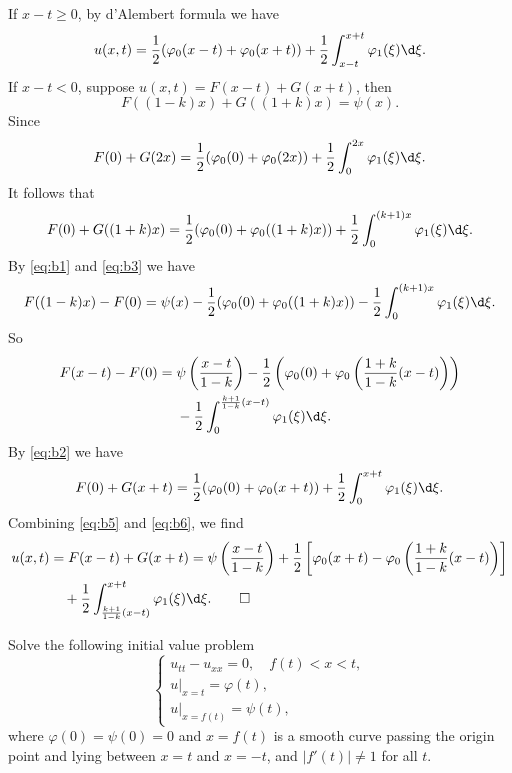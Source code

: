 \begin{solve}
  If $x-t\geq 0$, by d'Alembert formula we have
  \[u(x,t) = \frac{1}{2}(\varphi_0(x-t)+\varphi_0(x+t))
    + \frac{1}{2}\int_{x-t}^{x+t}\varphi_1(\xi)\d\xi.\]
  If $x-t<0$, suppose $u(x,t) = F(x-t) + G(x+t)$, then
  \begin{equation}\label{eq:b1}
    F((1-k)x)+G((1+k)x)=\psi(x).
  \end{equation}
  Since
  \begin{equation}\label{eq:b2}
    F(0)+G(2x)=\frac{1}{2}(\varphi_0(0)+\varphi_0(2x))+\frac{1}{2}\int_0^{2x}\varphi_1(\xi)\d\xi.
  \end{equation}
  It follows that
  \begin{equation}\label{eq:b3}
    F(0)+G((1+k)x) = \frac{1}{2}(\varphi_0(0)+\varphi_0((1+k)x))
      + \frac{1}{2}\int_0^{(k+1)x}\varphi_1(\xi) \d\xi.
  \end{equation}
  By \eqref{eq:b1} and \eqref{eq:b3} we have
  \begin{equation}\label{eq:b4}
    F((1-k)x)-F(0) = \psi(x)-\frac{1}{2}(\varphi_0(0)+\varphi_0((1+k)x))
      - \frac{1}{2}\int_0^{(k+1)x}\varphi_1(\xi) \d\xi.
  \end{equation}
  So
  \begin{equation}\label{eq:b5}
    \begin{aligned}
      F(x-t)-F(0) ={}
      & \psi\left(\frac{x-t}{1-k}\right)-\frac{1}{2}\left(\varphi_0(0)+\varphi_0\left(\frac{1+k}{1-k}(x-t)\right)\right) \\
      & -\frac{1}{2}\int_0^{\frac{k+1}{1-k}(x-t)}\varphi_1(\xi) \d\xi.
    \end{aligned}
  \end{equation}
  By \eqref{eq:b2} we have
  \begin{equation}\label{eq:b6}
    F(0)+G(x+t)=\frac{1}{2}(\varphi_0(0)+\varphi_0(x+t))+\frac{1}{2}\int_0^{x+t}\varphi_1(\xi) \d\xi.
  \end{equation}
  Combining \eqref{eq:b5} and \eqref{eq:b6}, we find
  \[\begin{split}
    u(x,t)
    & = F(x-t)+G(x+t)=\psi\left(\frac{x-t}{1-k}\right)+\frac{1}{2}\left[\varphi_0(x+t)-\varphi_0\left(\frac{1+k}{1-k}(x-t)\right)\right] \\
    & \quad + \frac{1}{2}\int_{\frac{k+1}{1-k}(x-t)}^{x+t}\varphi_1(\xi) \d\xi. \qedhere
  \end{split}\]
\end{solve}


\begin{exercise}
  Solve the following initial value problem
  \[\begin{cases}
    u_{tt} - u_{xx} = 0,\quad f(t) < x < t, \\
    u|_{x=t} = \varphi(t), \\
    u|_{x = f(t)} = \psi(t),
  \end{cases}\]
  where $\varphi(0)=\psi(0)=0$ and $x = f(t)$ is a smooth curve
  passing the origin point and lying between $x=t$ and $x=-t$,
  and $|f'(t)|\neq 1$ for all $t$.
\end{exercise}

